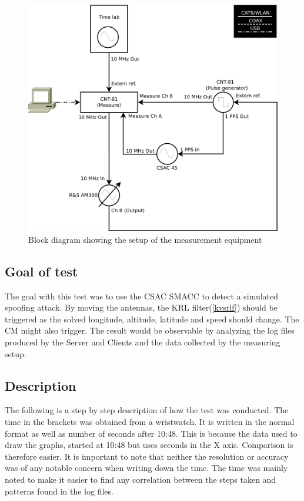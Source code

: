 \documentclass[12pt,english,a4paper]{report}
\begin{document}
\begin{figure}
\centering
  \includegraphics[scale=0.31]{measure_setup.pdf}
   \caption[Measurement setup]{Block diagram showing the setup of the measurement equipment}
   \label{msd}
\end{figure}

\subsection{Goal of test}
The goal with this test was to use the CSAC SMACC to detect a simulated spoofing attack. By moving the antennas, the KRL filter(\ref{kvsrlf}) should be triggered as the solved longitude, altitude, latitude and speed should change. The CM might also trigger. The result would be observable by analyzing the log files produced by the Server and Clients and the data collected by the measuring setup.

\subsection{Description}\label{description}
The following is a step by step description of how the test was conducted. The time in the brackets was obtained from a wristwatch. It is written in the normal format as well as number of seconds after 10:48. This is because the data used to draw the graphs, started at 10:48 but uses seconds in the X axis. Comparison is therefore easier. It is important to note that neither the resolution or accuracy was of any notable concern when writing down the time. The time was mainly noted to make it easier to find any correlation between the steps taken and patterns found in the log files. 
\end{document}
